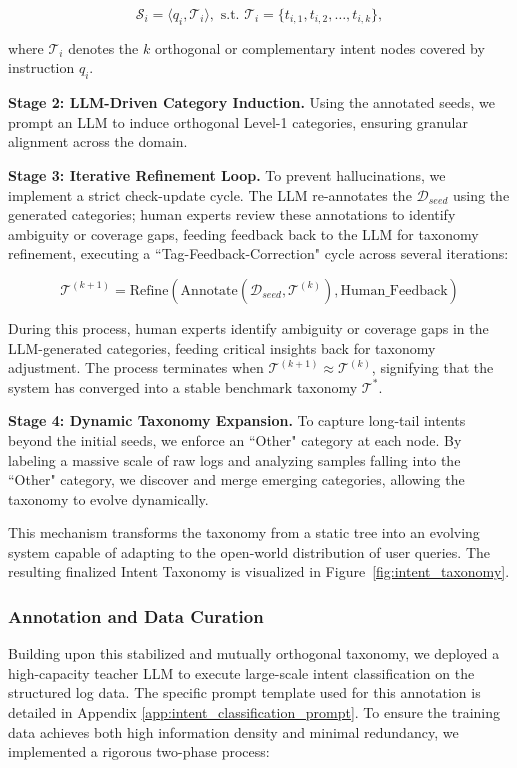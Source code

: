 \documentclass{article} %
\begin{document}
$$\mathcal{S}_i = \langle q_i, \mathcal{T}_i \rangle, \text{ s.t. } \mathcal{T}_i = \{t_{i,1}, t_{i,2}, \dots, t_{i,k}\},$$

where $\mathcal{T}_i$ denotes the $k$ orthogonal or complementary intent nodes covered by instruction $q_i$.

{\textbf{Stage 2: LLM-Driven Category Induction.}} Using the annotated seeds, we prompt an LLM to induce orthogonal Level-1 categories, ensuring granular alignment across the domain.

{\textbf{Stage 3: Iterative Refinement Loop.}} To prevent hallucinations, we implement a strict check-update cycle. The LLM re-annotates the $\mathcal{D}_{seed}$ using the generated categories; human experts review these annotations to identify ambiguity or coverage gaps, feeding feedback back to the LLM for taxonomy refinement, executing a ``Tag-Feedback-Correction" cycle across several iterations:

$$\mathcal{T}^{(k+1)} = \text{Refine}\left( \text{Annotate}(\mathcal{D}_{seed}, \mathcal{T}^{(k)}), \text{Human\_Feedback} \right)$$

During this process, human experts identify ambiguity or coverage gaps in the LLM-generated categories, feeding critical insights back for taxonomy adjustment. The process terminates when $\mathcal{T}^{(k+1)} \approx \mathcal{T}^{(k)}$, signifying that the system has converged into a stable benchmark taxonomy $\mathcal{T}^*$.

{\textbf{Stage 4: Dynamic Taxonomy Expansion.}} To capture long-tail intents beyond the initial seeds, we enforce an ``Other" category at each node. By labeling a massive scale of raw logs and analyzing samples falling into the ``Other" category, we discover and merge emerging categories, allowing the taxonomy to evolve dynamically.


This mechanism transforms the taxonomy from a static tree into an evolving system capable of adapting to the open-world distribution of user queries. The resulting finalized Intent Taxonomy is visualized in Figure~\ref{fig:intent_taxonomy}.

\subsubsection{Annotation and Data Curation}


Building upon this stabilized and mutually orthogonal taxonomy, we deployed a high-capacity teacher LLM to execute large-scale intent classification on the structured log data. The specific prompt template used for this annotation is detailed in Appendix \ref{app:intent_classification_prompt}. To ensure the training data achieves both high information density and minimal redundancy, we implemented a rigorous two-phase process:
\end{document}
